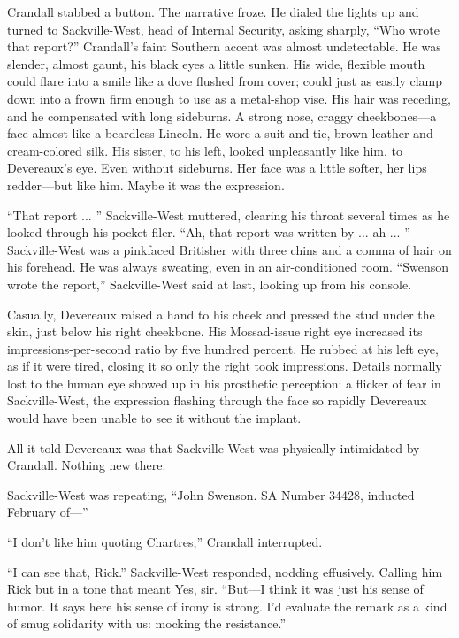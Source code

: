 Crandall stabbed a button. The narrative froze. He dialed the lights up and turned to Sackville-West, head of Internal Security, asking sharply, ``Who wrote that report?'' Crandall's faint Southern accent was almost undetectable. He was slender, almost gaunt, his black eyes a little sunken. His wide, flexible mouth could flare into a smile like a dove flushed from cover; could just as easily clamp down into a frown firm enough to use as a metal-shop vise. His hair was receding, and he compensated with long sideburns. A strong nose, craggy cheekbones—a face almost like a beardless Lincoln. He wore a suit and tie, brown leather and cream-colored silk. His sister, to his left, looked unpleasantly like him, to Devereaux's eye. Even without sideburns. Her face was a little softer, her lips redder—but like him. Maybe it was the expression.

``That report ... '' Sackville-West muttered, clearing his throat several times as he looked through his pocket filer. ``Ah, that report was written by ... ah ... '' Sackville-West was a pinkfaced Britisher with three chins and a comma of hair on his forehead. He was always sweating, even in an air-conditioned room. ``Swenson wrote the report,'' Sackville-West said at last, looking up from his console.

Casually, Devereaux raised a hand to his cheek and pressed the stud under the skin, just below his right cheekbone. His Mossad-issue right eye increased its impressions-per-second ratio by five hundred percent. He rubbed at his left eye, as if it were tired, closing it so only the right took impressions. Details normally lost to the human eye showed up in his prosthetic perception: a flicker of fear in Sackville-West, the expression flashing through the face so rapidly Devereaux would have been unable to see it without the implant.

All it told Devereaux was that Sackville-West was physically intimidated by Crandall. Nothing new there.

Sackville-West was repeating, ``John Swenson. SA Number 34428, inducted February of—''

``I don't like him quoting Chartres,'' Crandall interrupted.

``I can see that, Rick.'' Sackville-West responded, nodding effusively. Calling him Rick but in a tone that meant Yes, sir. ``But—I think it was just his sense of humor. It says here his sense of irony is strong. I'd evaluate the remark as a kind of smug solidarity with us: mocking the resistance.''


